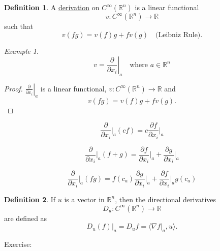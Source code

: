 \documentclass[11pt]{article}
\theoremstyle{definition}
\newtheorem{definition}{Definition}[section]
\theoremstyle{remark}
\newtheorem{example}{Example}[section]
\begin{document}
\begin{definition}\label{def:derivation}
A \underline{derivation} on $C^\infty(\mathbb{R}^n)$ is a linear functional
\[ v: C^\infty(\mathbb{R}^n) \to \mathbb{R} \]
such that
\[ v(fg) = v(f)g + f v(g) \quad \text{(Leibniz Rule)}. \]
\end{definition}

\begin{example}\label{ex:partial_derivative}
\[ v = \left. \frac{\partial}{\partial x_i} \right|_a \quad \text{where } a \in \mathbb{R}^n \]
\end{example}

\begin{proof}
$\left. \frac{\partial}{\partial x_i} \right|_a$ is a linear functional, $v: C^\infty(\mathbb{R}^n) \to \mathbb{R}$ and
\[ v(fg) = v(f)g + f v(g). \]
\end{proof}

\[
\frac{\partial}{\partial x_i} \bigg|_a (cf) = c \frac{\partial f}{\partial x_i} \bigg|_a
\]

\[
\frac{\partial}{\partial x_i} \bigg|_a (f + g) = \frac{\partial f}{\partial x_i} \bigg|_a + \frac{\partial g}{\partial x_i} \bigg|_a
\]

\[
\frac{\partial}{\partial x_i} \bigg|_a (fg) = f(c_a) \frac{\partial g}{\partial x_i} \bigg|_a + \frac{\partial f}{\partial x_i} \bigg|_a g(c_a)
\]

\begin{definition}\label{def:directional_derivative}
If $u$ is a vector in $\mathbb{R}^n$, then the directional derivatives
\[
D_u : C^\infty(\mathbb{R}^n) \to \mathbb{R}
\]
are defined as
\[
D_u (f) \bigg|_a = D_u f = \langle \nabla f \big|_a, u \rangle.
\]
\end{definition}

Exercise:
\end{document}
